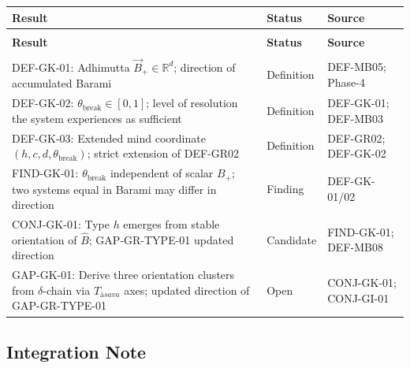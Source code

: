 \documentclass[12pt, a4paper]{article}
\providecommand{\Bplus}{B_{+}}
\providecommand{\Bvec}{\vec{B}_{+}}
\providecommand{\Tasava}{T_{\bar{\mathrm{a}}sava}}
\providecommand{\tbreak}{\theta_{\mathrm{break}}}
\providecommand{\Tasava}{\mathcal{T}_{\!\mathrm{\bar{a}sava}}}
\begin{document}
{\small
\setlength{\LTpre}{4pt}\setlength{\LTpost}{4pt}
\renewcommand{\arraystretch}{1.30}
\begin{longtable}{>{\raggedright\arraybackslash}p{5.8cm}
                  >{\centering\arraybackslash}p{2.4cm}
                  >{\raggedright\arraybackslash}p{4.1cm}}
\toprule
\textbf{Result} & \textbf{Status} & \textbf{Source} \\
\midrule
\endfirsthead
\multicolumn{3}{l}{\small\textit{(continued)}}\\[4pt]
\toprule
\textbf{Result} & \textbf{Status} & \textbf{Source} \\
\midrule
\endhead
\midrule
\multicolumn{3}{r}{\small\textit{(continues)}}\\
\endfoot
\bottomrule
\endlastfoot

DEF-GK-01: Adhimutta $\Bvec \in \mathbb{R}^d$;
  direction of accumulated Barami &
  Definition & DEF-MB05; Phase-4 \\

DEF-GK-02: $\tbreak \in [0,1]$; level of resolution
  the system experiences as sufficient &
  Definition & DEF-GK-01; DEF-MB03 \\

DEF-GK-03: Extended mind coordinate
  $(h,c,d,\tbreak)$; strict extension of DEF-GR02 &
  Definition & DEF-GR02; DEF-GK-02 \\

FIND-GK-01: $\tbreak$ independent of scalar $\Bplus$;
  two systems equal in Barami may differ in direction &
  Finding & DEF-GK-01/02 \\

CONJ-GK-01: Type $h$ emerges from stable orientation
  of $\hat{B}$; GAP-GR-TYPE-01 updated direction &
  Candidate & FIND-GK-01; DEF-MB08 \\

GAP-GK-01: Derive three orientation clusters from
  $\delta$-chain via $\Tasava$ axes; updated
  direction of GAP-GR-TYPE-01 &
  Open & CONJ-GK-01; CONJ-GI-01 \\

\end{longtable}
}
\vspace{-\parskip}

\subsection{Integration Note}
\end{document}
